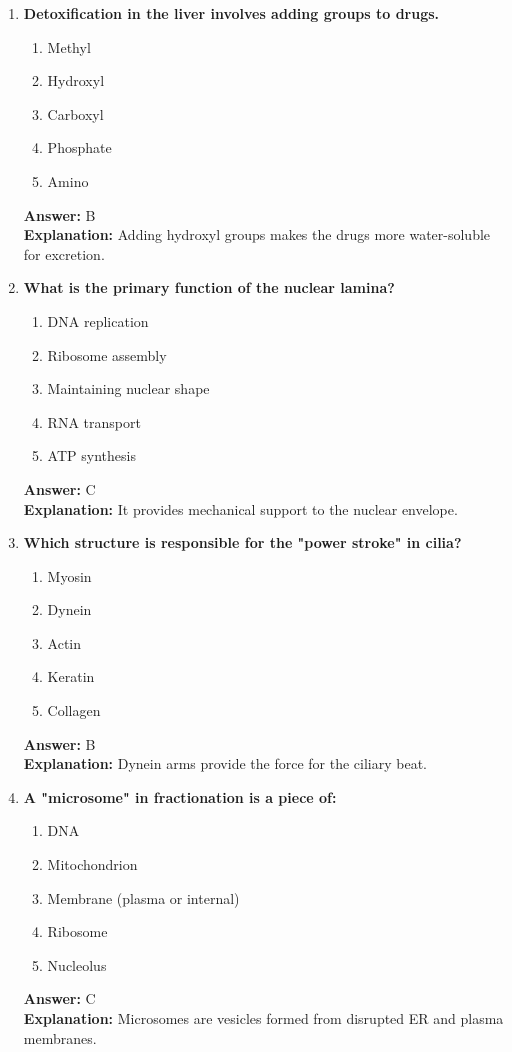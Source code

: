 \documentclass[11pt, a4paper]{article}
\begin{document}
\begin{enumerate}[leftmargin=*, label=\arabic*.]
\item \textbf{Detoxification in the liver involves adding \underline{\hspace{1cm}} groups to drugs.}
\begin{enumerate}[label=\Alph*.]
\item Methyl
\item Hydroxyl
\item Carboxyl
\item Phosphate
\item Amino
\end{enumerate}
\textbf{Answer:} B \\
\textbf{Explanation:} Adding hydroxyl groups makes the drugs more water-soluble for excretion.

\item \textbf{What is the primary function of the nuclear lamina?}
\begin{enumerate}[label=\Alph*.]
\item DNA replication
\item Ribosome assembly
\item Maintaining nuclear shape
\item RNA transport
\item ATP synthesis
\end{enumerate}
\textbf{Answer:} C \\
\textbf{Explanation:} It provides mechanical support to the nuclear envelope.

\item \textbf{Which structure is responsible for the "power stroke" in cilia?}
\begin{enumerate}[label=\Alph*.]
\item Myosin
\item Dynein
\item Actin
\item Keratin
\item Collagen
\end{enumerate}
\textbf{Answer:} B \\
\textbf{Explanation:} Dynein arms provide the force for the ciliary beat.

\item \textbf{A "microsome" in fractionation is a piece of:}
\begin{enumerate}[label=\Alph*.]
\item DNA
\item Mitochondrion
\item Membrane (plasma or internal)
\item Ribosome
\item Nucleolus
\end{enumerate}
\textbf{Answer:} C \\
\textbf{Explanation:} Microsomes are vesicles formed from disrupted ER and plasma membranes.


\end{enumerate}
\end{document}
